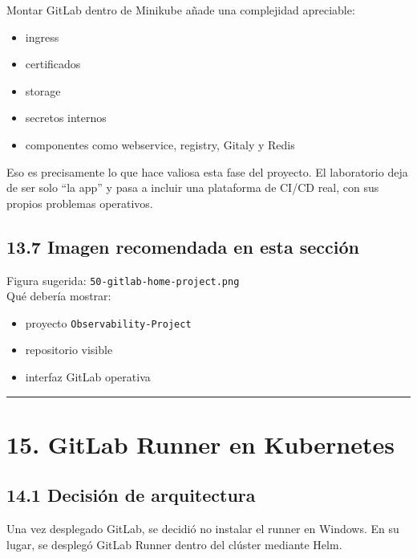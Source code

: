 \documentclass[
a4paper,
12pt]{report}
\providecommand{\tightlist}{%
  \setlength{\itemsep}{0pt}\setlength{\parskip}{0pt}}
\begin{document}
Montar GitLab dentro de Minikube añade una complejidad apreciable:

\begin{itemize}
\tightlist
\item
  ingress
\item
  certificados
\item
  storage
\item
  secretos internos
\item
  componentes como webservice, registry, Gitaly y Redis
\end{itemize}

Eso es precisamente lo que hace valiosa esta fase del proyecto. El
laboratorio deja de ser solo ``la app'' y pasa a incluir una plataforma
de CI/CD real, con sus propios problemas operativos.

\section{13.7 Imagen recomendada en esta
sección}\label{imagen-recomendada-en-esta-secciuxf3n-7}

Figura sugerida: \texttt{50-gitlab-home-project.png}\\
Qué debería mostrar:

\begin{itemize}
\tightlist
\item
  proyecto \texttt{Observability-Project}
\item
  repositorio visible
\item
  interfaz GitLab operativa
\end{itemize}

\begin{center}\rule{0.5\linewidth}{0.5pt}\end{center}

\chapter{15. GitLab Runner en
Kubernetes}\label{gitlab-runner-en-kubernetes}

\section{14.1 Decisión de
arquitectura}\label{decisiuxf3n-de-arquitectura}

Una vez desplegado GitLab, se decidió no instalar el runner en Windows.
En su lugar, se desplegó GitLab Runner dentro del clúster mediante Helm.
\end{document}

